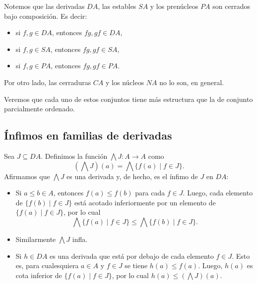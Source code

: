 \documentclass[12pt,letterpaper,titlepage]{article}
\theoremstyle{definition}
\newcommand\Inf{\bigwedge}
\newcommand\<{\langle}
\renewcommand\>{\rangle}
\begin{document}
Notemos que las derivadas $DA$, las estables $SA$ y los
prenúcleos $PA$ son cerrados bajo composición.
Es decir:
\begin{itemize}
  \item si $f,g\in DA$, entonces $fg,gf\in DA$,
  \item si $f,g\in SA$, entonces $fg,gf\in SA$,
  \item si $f,g\in PA$, entonces $fg,gf\in PA$.
\end{itemize}
Por otro lado, las cerraduras $CA$ y los núcleos $NA$
no lo son, en general.

Veremos que cada uno de estos conjuntos tiene más
estructura que la de conjunto parcialmente ordenado.

\subsection{Ínfimos en familias de derivadas}

Sea $J\subseteq DA$.
Definimos la función $\Inf J:A\to A$ como
\[
  (\Inf J)(a) = \Inf\{f(a) \mid f\in J\}
.\]
Afirmamos que $\Inf J$ es una derivada y, de hecho, es el ínfimo
de $J$ en $DA$:
\begin{itemize}
  \item
  Si $a\leq b\in A$, entonces $f(a)\leq f(b)$ para cada $f\in J$.
  Luego, cada elemento de $\{f(b)\mid f\in J\}$ está acotado
  inferiormente por un elemento de $\{f(a)\mid f\in J\}$, por lo
  cual
  \[
    \Inf\{f(a)\mid f\in J\} \leq \Inf\{f(b)\mid f\in J\}
  .\]
  \item
  Similarmente $\Inf J$ infla.
  \item
  Si $h\in DA$ es una derivada que está por debajo de cada
  elemento $f\in J$.
  Esto es, para cualesquiera $a\in A$ y $f\in J$ se tiene
  $h(a)\leq f(a)$.
  Luego, $h(a)$ es cota inferior de $\{f(a) \mid f\in J\}$, por
  lo cual $h(a)\leq (\Inf J)(a)$.
\end{itemize}
\end{document}
